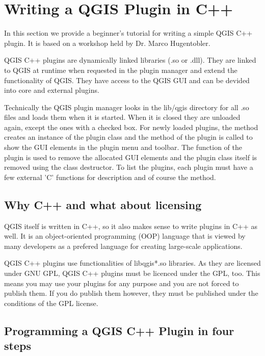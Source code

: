 \section{Writing a QGIS Plugin in C++}\label{cpp_plugin}

\updatedisclaimer

In this section we provide a beginner's tutorial for writing a simple QGIS
C++ plugin. It is based on a workshop held by Dr. Marco Hugentobler. 

QGIS C++ plugins are dynamically linked libraries (.so or .dll). They are
linked to QGIS at runtime when requested in the plugin manager and extend the
functionality of QGIS. They have access to the QGIS GUI and can be devided
into core and external plugins.

Technically the QGIS plugin manager looks in the lib/qgis directory for all
.so files and loads them when it is started. When it is closed they are
unloaded again, except the ones with a checked box. For newly loaded plugins,
the  method creates an instance of the plugin class and
the  method of the plugin is called to show the GUI elements
in the plugin menu and toolbar. The  function of the plugin
is used to remove the allocated GUI elements and the plugin class itself is
removed using the class destructor. To list the plugins, each plugin must
have a few external 'C' functions for description and of course the
 method.

\subsection{Why C++ and what about licensing}

QGIS itself is written in C++, so it also makes sense to write plugins in C++
as well. It is an object-oriented programming (OOP) language that is viewed
by many developers as a prefered language for creating large-scale
applications.

QGIS C++ plugins use functionalities of libqgis*.so libraries. As they are
licensed under GNU GPL, QGIS C++ plugins must be licenced under the GPL, too.
This means you may use your plugins for any purpose and you are not forced to
publish them. If you do publish them however, they must be published under
the conditions of the GPL license. 

\subsection{Programming a QGIS C++ Plugin in four steps}

